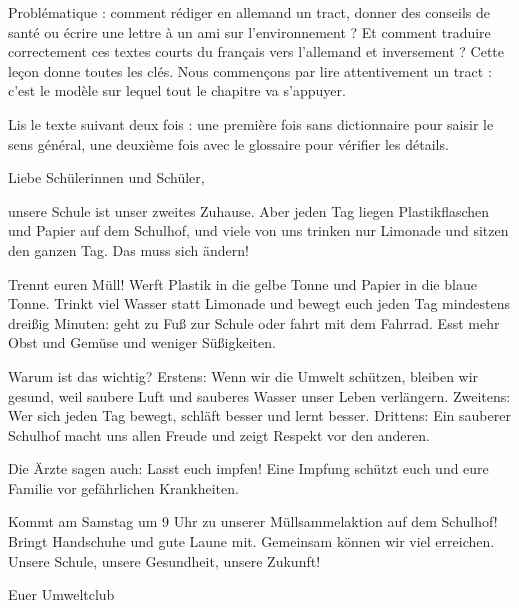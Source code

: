 \documentclass[11pt]{article}
\newcounter{popsec}
\newcounter{popsub}
\newcommand{\courssub}[1]{%
  \stepcounter{popsub}%
  \par\vspace{9pt}\noindent{\popxbold\fontsize{11.5}{13}\selectfont\color{popink}{\color{poporange}\thepopsec.\thepopsub}\hspace{6pt}#1}\par\nopagebreak\vspace{4pt}
}
\begin{document}
Problématique : comment rédiger en allemand un tract, donner des conseils de santé ou écrire une lettre à un ami sur l'environnement ? Et comment traduire correctement ces textes courts du français vers l'allemand et inversement ? Cette leçon donne toutes les clés. Nous commençons par lire attentivement un tract : c'est le modèle sur lequel tout le chapitre va s'appuyer.

\courssub{Lecture globale du tract}

Lis le texte suivant deux fois : une première fois sans dictionnaire pour saisir le sens général, une deuxième fois avec le glossaire pour vérifier les détails.

\begin{textebox}
Liebe Schülerinnen und Schüler,

unsere Schule ist unser zweites Zuhause. Aber jeden Tag liegen Plastikflaschen und Papier auf dem Schulhof, und viele von uns trinken nur Limonade und sitzen den ganzen Tag. Das muss sich ändern!

Trennt euren Müll! Werft Plastik in die gelbe Tonne und Papier in die blaue Tonne. Trinkt viel Wasser statt Limonade und bewegt euch jeden Tag mindestens dreißig Minuten: geht zu Fuß zur Schule oder fahrt mit dem Fahrrad. Esst mehr Obst und Gemüse und weniger Süßigkeiten.

Warum ist das wichtig? Erstens: Wenn wir die Umwelt schützen, bleiben wir gesund, weil saubere Luft und sauberes Wasser unser Leben verlängern. Zweitens: Wer sich jeden Tag bewegt, schläft besser und lernt besser. Drittens: Ein sauberer Schulhof macht uns allen Freude und zeigt Respekt vor den anderen.

Die Ärzte sagen auch: Lasst euch impfen! Eine Impfung schützt euch und eure Familie vor gefährlichen Krankheiten.

Kommt am Samstag um 9 Uhr zu unserer Müllsammelaktion auf dem Schulhof! Bringt Handschuhe und gute Laune mit. Gemeinsam können wir viel erreichen. Unsere Schule, unsere Gesundheit, unsere Zukunft!

Euer Umweltclub
\end{textebox}
\end{document}
